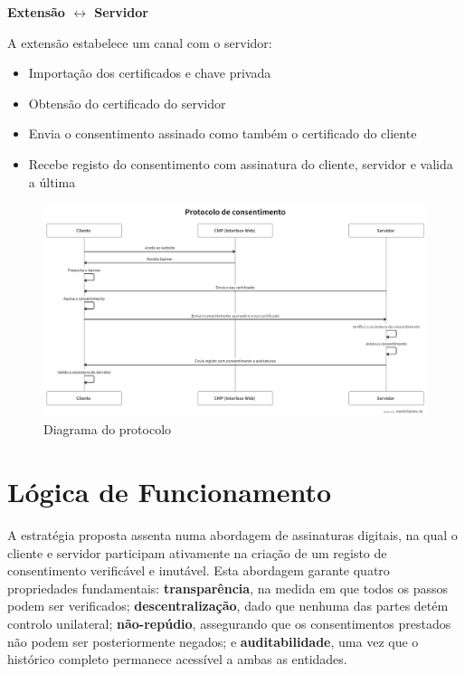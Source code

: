 \textbf{Extensão $\leftrightarrow$ Servidor}

A extensão estabelece um canal com o servidor:
\begin{itemize}
    \item Importação dos certificados e chave privada
    \item Obtensão do certificado do servidor
    \item Envia o consentimento assinado como também o certificado do cliente
    \item Recebe registo do consentimento com assinatura do cliente, servidor e valida a última
\end{itemize}

\begin{figure}[h]
\begin{center}
\includegraphics[width=1\textwidth]{images/swimlanes.png}
\end{center}
\caption{Diagrama do protocolo}
\label{fig:swimlane1}
\end{figure}

\newpage

\section{Lógica de Funcionamento}

A estratégia proposta assenta numa abordagem de assinaturas digitais, na qual o cliente e servidor participam ativamente na criação de um registo de consentimento verificável e imutável. Esta abordagem garante quatro propriedades fundamentais: \textbf{transparência}, na medida em que todos os passos podem ser verificados; \textbf{descentralização}, dado que nenhuma das partes detém controlo unilateral; \textbf{não-repúdio}, assegurando que os consentimentos prestados não podem ser posteriormente negados; e \textbf{auditabilidade}, uma vez que o histórico completo permanece acessível a ambas as entidades.

